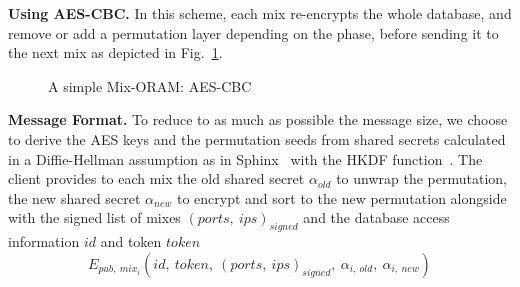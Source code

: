 \documentclass{llncs}
\begin{document}
\noindent\textbf{Using AES-CBC.} In this scheme, each mix re-encrypts the whole database, and remove or add a permutation layer depending on the phase, before sending it to the next mix as depicted in Fig.~\ref{fig:ASMO_CBC}.
%
\begin{figure}
\centering
\begin{adjustbox}{width=\textwidth}
\end{adjustbox}
\caption{A simple Mix-ORAM: AES-CBC} \label{fig:ASMO_CBC}
\end{figure} 

\noindent\textbf{Message Format.}
To reduce to as much as possible the message size, we choose to derive the AES keys and the permutation seeds from shared secrets calculated in a Diffie-Hellman assumption as in Sphinx~\cite{danezis2009sphinx} with the HKDF function~\cite{krawczyk2010cryptographic}.
The client provides to each mix the old shared secret $\alpha_{old}$ to unwrap the permutation, the new shared secret $\alpha_{new}$ to encrypt and sort to the new permutation alongside with the signed list of mixes $(ports,\ ips)_{signed}$ and the database access information $id$ and token $token$
$$E_{pub,\ mix_i}\left ( id,\ token,\ (ports,\ ips)_{signed},\ \alpha_{i,\ old},\ \alpha_{i,\ new} \right) $$
\end{document}
